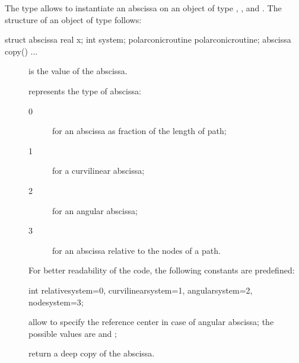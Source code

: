 \documentclass[pdftex]{article}
\begin{document}
The type  allows to instantiate an abscissa on an object
of type , ,  and . The
structure of an object of type  follows:
\begin{center}
  \begin{Vcolor}
    struct abscissa {
      real x; int system; polarconicroutine
      polarconicroutine;
      abscissa copy() {...}
    }
  \end{Vcolor}
\end{center}
\begin{description}
\item[] is the value of the abscissa.
\item[] represents the type of abscissa:
  \begin{description}
  \item[0] for an abscissa as fraction of the length of path;
  \item[1] for a curvilinear abscissa;
  \item[2] for an angular abscissa;
  \item[3] for an abscissa relative to the nodes of a path.
  \end{description}
  For better readability of the code, the following constants are
  predefined:
  \begin{Vcolor}
    int relativesystem=0, curvilinearsystem=1, angularsystem=2, nodesystem=3;
  \end{Vcolor}
\item[] allow to specify the reference
  center in case of angular abscissa; the possible values are
   and ;
\item[] return a deep copy of the abscissa.
\end{description}
\end{document}
